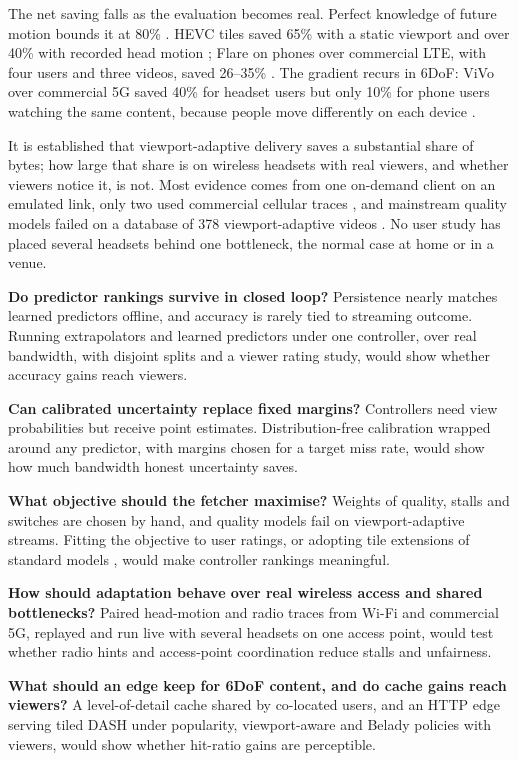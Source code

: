The net saving falls as the evaluation becomes real. Perfect knowledge of future motion bounds it at 80\% \cite{W2585813514}. HEVC tiles saved 65\% with a static viewport and over 40\% with recorded head motion \cite{W2623784065}; Flare on phones over commercial LTE, with four users and three videos, saved 26--35\% \cite{W2896840651}. The gradient recurs in 6DoF: ViVo over commercial 5G saved 40\% for headset users but only 10\% for phone users watching the same content, because people move differently on each device \cite{W3021314748}.

It is established that viewport-adaptive delivery saves a substantial share of bytes; how large that share is on wireless headsets with real viewers, and whether viewers notice it, is not. Most evidence comes from one on-demand client on an emulated link, only two used commercial cellular traces \cite{W3021314748,W2810704880}, and mainstream quality models failed on a database of 378 viewport-adaptive videos \cite{W4402916896}. No user study has placed several headsets behind one bottleneck, the normal case at home or in a venue.

\begin{openproblems}
\item \textbf{Do predictor rankings survive in closed loop?} Persistence nearly matches learned predictors offline, and accuracy is rarely tied to streaming outcome. Running extrapolators and learned predictors under one controller, over real bandwidth, with disjoint splits and a viewer rating study, would show whether accuracy gains reach viewers.
\item \textbf{Can calibrated uncertainty replace fixed margins?} Controllers need view probabilities but receive point estimates. Distribution-free calibration wrapped around any predictor, with margins chosen for a target miss rate, would show how much bandwidth honest uncertainty saves.
\item \textbf{What objective should the fetcher maximise?} Weights of quality, stalls and switches are chosen by hand, and quality models fail on viewport-adaptive streams. Fitting the objective to user ratings, or adopting tile extensions of standard models \cite{W3200608537,W3168206114}, would make controller rankings meaningful.
\item \textbf{How should adaptation behave over real wireless access and shared bottlenecks?} Paired head-motion and radio traces from Wi-Fi and commercial 5G, replayed and run live with several headsets on one access point, would test whether radio hints and access-point coordination reduce stalls and unfairness.
\item \textbf{What should an edge keep for 6DoF content, and do cache gains reach viewers?} A level-of-detail cache shared by co-located users, and an HTTP edge serving tiled DASH under popularity, viewport-aware and Belady policies with viewers, would show whether hit-ratio gains are perceptible.
\end{openproblems}
